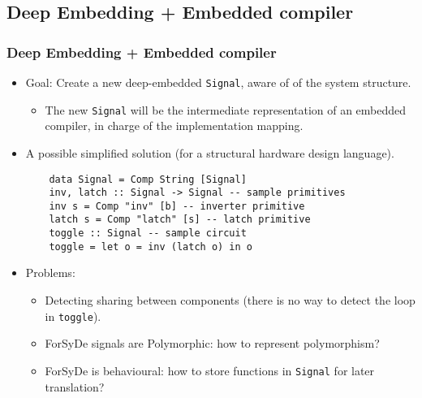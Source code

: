 \documentclass{beamer}
\begin{document}
\subsection{Deep Embedding + Embedded compiler}
\begin{frame}[fragile]
  \frametitle{Deep Embedding + Embedded compiler}
  \begin{itemize}
  \item Goal: Create a new deep-embedded \texttt{Signal}, aware of
    of the system structure.
    \begin{itemize}
    \item The new \texttt{Signal} will be the intermediate representation of
      an embedded compiler, in charge of the implementation mapping.
    \end{itemize}
    \pause
  \item A possible simplified solution (for a structural hardware
    design language).
\begin{lstlisting}   
    data Signal = Comp String [Signal] 
    inv, latch :: Signal -> Signal -- sample primitives 
    inv s = Comp "inv" [b] -- inverter primitive
    latch s = Comp "latch" [s] -- latch primitive
    toggle :: Signal -- sample circuit
    toggle = let o = inv (latch o) in o      
\end{lstlisting}
    \pause
  \item Problems:
    \begin{itemize}
      \pause
    \item Detecting sharing between components (there is no way to detect
      the loop in \texttt{toggle}).
      \pause
    \item ForSyDe signals are Polymorphic: how to represent polymorphism?
      \pause
    \item ForSyDe is behavioural: how to store functions in \texttt{Signal} for
      later translation?
    \end{itemize}
  \end{itemize}
\end{frame}
\end{document}
